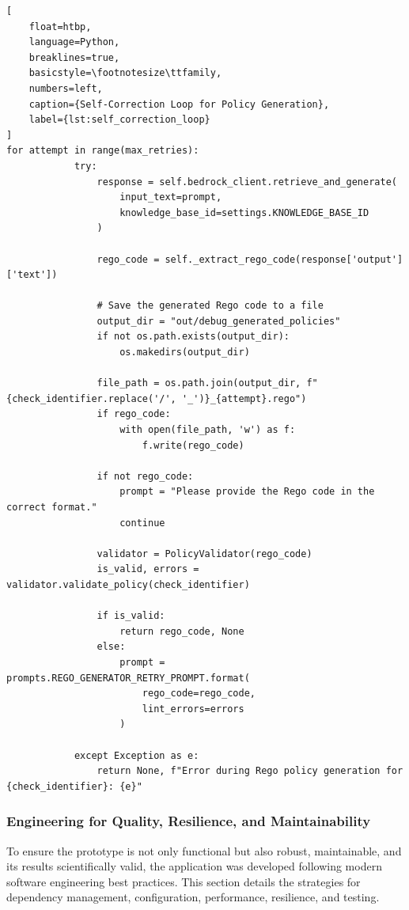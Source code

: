 \begin{lstlisting}[
    float=htbp,
    language=Python, 
    breaklines=true, 
    basicstyle=\footnotesize\ttfamily, 
    numbers=left,
    caption={Self-Correction Loop for Policy Generation},
    label={lst:self_correction_loop}
]
for attempt in range(max_retries):
            try:
                response = self.bedrock_client.retrieve_and_generate(
                    input_text=prompt,
                    knowledge_base_id=settings.KNOWLEDGE_BASE_ID
                )

                rego_code = self._extract_rego_code(response['output']['text'])

                # Save the generated Rego code to a file
                output_dir = "out/debug_generated_policies"
                if not os.path.exists(output_dir):
                    os.makedirs(output_dir)
                
                file_path = os.path.join(output_dir, f"{check_identifier.replace('/', '_')}_{attempt}.rego")
                if rego_code:
                    with open(file_path, 'w') as f:
                        f.write(rego_code)

                if not rego_code:
                    prompt = "Please provide the Rego code in the correct format."
                    continue

                validator = PolicyValidator(rego_code)
                is_valid, errors = validator.validate_policy(check_identifier)

                if is_valid:
                    return rego_code, None
                else:
                    prompt = prompts.REGO_GENERATOR_RETRY_PROMPT.format(
                        rego_code=rego_code,
                        lint_errors=errors
                    )

            except Exception as e:
                return None, f"Error during Rego policy generation for {check_identifier}: {e}"
\end{lstlisting}

\subsubsection{Engineering for Quality, Resilience, and Maintainability}

To ensure the prototype is not only functional but also robust, maintainable, and its results scientifically valid, the application was developed following modern software engineering best practices. This section details the strategies for dependency management, configuration, performance, resilience, and testing.

